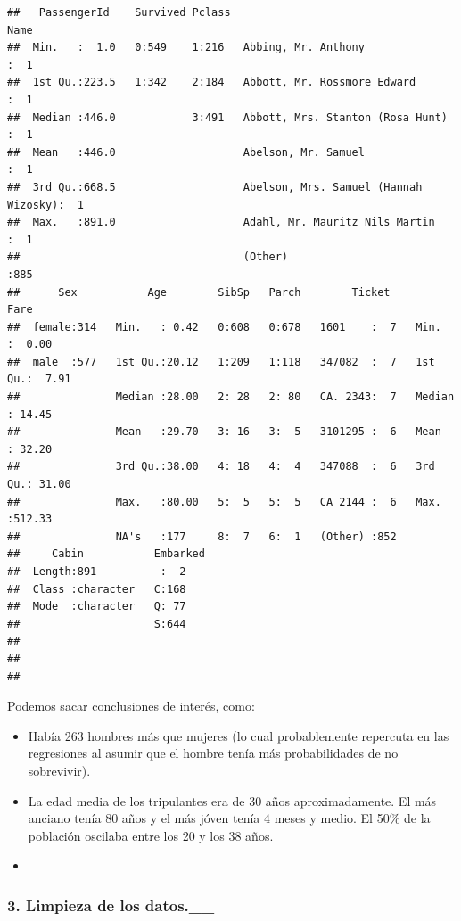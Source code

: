 \documentclass[]{article}
\begin{document}
\begin{verbatim}
##   PassengerId    Survived Pclass                                     Name    
##  Min.   :  1.0   0:549    1:216   Abbing, Mr. Anthony                  :  1  
##  1st Qu.:223.5   1:342    2:184   Abbott, Mr. Rossmore Edward          :  1  
##  Median :446.0            3:491   Abbott, Mrs. Stanton (Rosa Hunt)     :  1  
##  Mean   :446.0                    Abelson, Mr. Samuel                  :  1  
##  3rd Qu.:668.5                    Abelson, Mrs. Samuel (Hannah Wizosky):  1  
##  Max.   :891.0                    Adahl, Mr. Mauritz Nils Martin       :  1  
##                                   (Other)                              :885  
##      Sex           Age        SibSp   Parch        Ticket         Fare       
##  female:314   Min.   : 0.42   0:608   0:678   1601    :  7   Min.   :  0.00  
##  male  :577   1st Qu.:20.12   1:209   1:118   347082  :  7   1st Qu.:  7.91  
##               Median :28.00   2: 28   2: 80   CA. 2343:  7   Median : 14.45  
##               Mean   :29.70   3: 16   3:  5   3101295 :  6   Mean   : 32.20  
##               3rd Qu.:38.00   4: 18   4:  4   347088  :  6   3rd Qu.: 31.00  
##               Max.   :80.00   5:  5   5:  5   CA 2144 :  6   Max.   :512.33  
##               NA's   :177     8:  7   6:  1   (Other) :852                   
##     Cabin           Embarked
##  Length:891          :  2   
##  Class :character   C:168   
##  Mode  :character   Q: 77   
##                     S:644   
##                             
##                             
## 
\end{verbatim}

Podemos sacar conclusiones de interés, como:

\begin{itemize}
\item
  Había 263 hombres más que mujeres (lo cual probablemente repercuta en
  las regresiones al asumir que el hombre tenía más probabilidades de no
  sobrevivir).
\item
  La edad media de los tripulantes era de 30 años aproximadamente. El
  más anciano tenía 80 años y el más jóven tenía 4 meses y medio. El
  50\% de la población oscilaba entre los 20 y los 38 años.
\item
\end{itemize}

\hypertarget{limpieza-de-los-datos.__}{%
\subsubsection{3. Limpieza de los
datos.\_\_}\label{limpieza-de-los-datos.__}}
\end{document}
